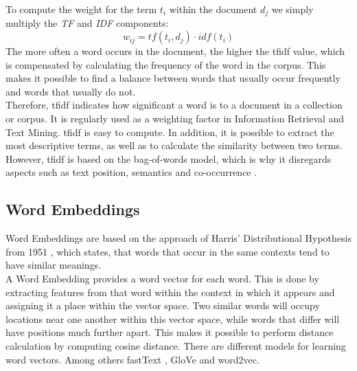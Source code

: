 \documentclass[a4paper, 11pt,titlepage,oneside,openany]{book}
\begin{document}
\indent To compute the weight for the term $t_i$ within the document $d_j$ we simply multiply the \textit{TF} and \textit{IDF} components:
\[
w_{ij}=tf(t_i, d_j)\cdot idf(t_i)
\]
\indent The more often a word occurs in the document, the higher the \gls{tfidf} value, which is compensated by calculating the frequency of the word in the corpus. This makes it possible to find a balance between words that usually occur frequently and words that usually do not.\\
\newpage
Therefore, \Gls{tfidf} indicates how significant a word is to a document in a collection or corpus. It is regularly used as a weighting factor in Information Retrieval and Text Mining. \Gls{tfidf} is easy to compute. In addition, it is possible to extract the most descriptive terms, as well as to calculate the similarity between two terms. However, \gls{tfidf} is based on the bag-of-words model, which is why it disregards aspects such as text position, semantics and co-occurrence \cite{distributionalhypothesis}.

\subsection{Word Embeddings}
\indent Word Embeddings are based on the approach of Harris' Distributional Hypothesis from 1951 \cite{distributionalhypothesis}, which states, that words that occur in the same contexts tend to have similar meanings. \\
\indent A Word Embedding provides a word vector for each word. This is done by extracting features from that word within the context in which it appears and assigning it a place within the vector space. Two similar words will occupy locations near one another within this vector space, while words that differ will have positions much further apart. This makes it possible to perform distance calculation by computing cosine distance. There are different models for learning word vectors. Among others fastText \cite{fasttext}, GloVe \cite{glove} and word2vec. \\
\end{document}
